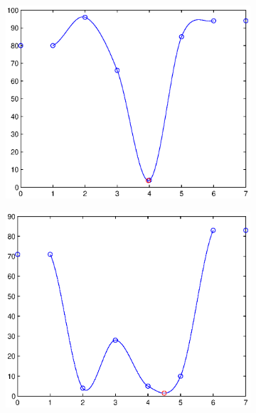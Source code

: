 \documentclass{article}
\begin{document}
\begin{figure}[H]
	\centering
	\begin{subfigure}{0.45\textwidth}
		\includegraphics[width=\linewidth]{spline1}
	\end{subfigure}
	\begin{subfigure}{0.45\textwidth}
		\includegraphics[width=\linewidth]{spline2}
	\end{subfigure}
	\begin{subfigure}{0.45\textwidth}

\end{subfigure}
\end{figure}
\end{document}
